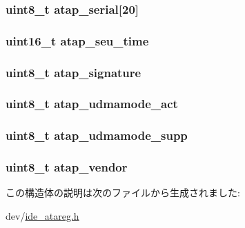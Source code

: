 \label{structataparams_aea2e9a1373bc2e48360c489b6a980f73}
\hypertarget{structataparams_a36ca7978b41d5cd5dd9dae079fb42b27}{
\subsubsection[{atap\_\-serial}]{\setlength{\rightskip}{0pt plus 5cm}uint8\_\-t {\bf atap\_\-serial}\mbox{[}20\mbox{]}}}
\label{structataparams_a36ca7978b41d5cd5dd9dae079fb42b27}
\hypertarget{structataparams_afad2611c0b5c3000e0b66f3e849a3d95}{
\subsubsection[{atap\_\-seu\_\-time}]{\setlength{\rightskip}{0pt plus 5cm}uint16\_\-t {\bf atap\_\-seu\_\-time}}}
\label{structataparams_afad2611c0b5c3000e0b66f3e849a3d95}
\hypertarget{structataparams_ac23d146c48d943a085e1952a951bd7ee}{
\subsubsection[{atap\_\-signature}]{\setlength{\rightskip}{0pt plus 5cm}uint8\_\-t {\bf atap\_\-signature}}}
\label{structataparams_ac23d146c48d943a085e1952a951bd7ee}
\hypertarget{structataparams_a5774eaa4ffc2f87ed698c2386a23903a}{
\subsubsection[{atap\_\-udmamode\_\-act}]{\setlength{\rightskip}{0pt plus 5cm}uint8\_\-t {\bf atap\_\-udmamode\_\-act}}}
\label{structataparams_a5774eaa4ffc2f87ed698c2386a23903a}
\hypertarget{structataparams_a50f15151b8e9e897f18e693c9f1d2e43}{
\subsubsection[{atap\_\-udmamode\_\-supp}]{\setlength{\rightskip}{0pt plus 5cm}uint8\_\-t {\bf atap\_\-udmamode\_\-supp}}}
\label{structataparams_a50f15151b8e9e897f18e693c9f1d2e43}
\hypertarget{structataparams_a39ed493fed8549cd9684fa60ba94aeea}{
\subsubsection[{atap\_\-vendor}]{\setlength{\rightskip}{0pt plus 5cm}uint8\_\-t {\bf atap\_\-vendor}}}
\label{structataparams_a39ed493fed8549cd9684fa60ba94aeea}


この構造体の説明は次のファイルから生成されました:\begin{DoxyCompactItemize}
\item 
dev/\hyperlink{ide__atareg_8h}{ide\_\-atareg.h}\end{DoxyCompactItemize}
